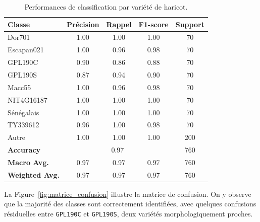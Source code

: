\begin{table}[H]
	\centering
	\caption{Performances de classification par variété de haricot.}
	\label{tab:classification_metrics}
	\begin{tabular}{|l|c|c|c|c|}
		\hline
		\textbf{Classe}        & \textbf{Précision}        & \textbf{Rappel} & \textbf{F1-score} & \textbf{Support} \\
		\hline
		Dor701                 & 1.00                      & 1.00            & 1.00              & 70               \\
		Escapan021             & 1.00                      & 0.96            & 0.98              & 70               \\
		GPL190C                & 0.90                      & 0.86            & 0.88              & 70               \\
		GPL190S                & 0.87                      & 0.94            & 0.90              & 70               \\
		Macc55                 & 1.00                      & 0.96            & 0.98              & 70               \\
		NIT4G16187             & 1.00                      & 1.00            & 1.00              & 70               \\
		Sénégalais             & 1.00                      & 1.00            & 1.00              & 70               \\
		TY339612               & 0.96                      & 1.00            & 0.98              & 70               \\
		Autre                  & 1.00                      & 1.00            & 1.00              & 200              \\
		\hline
		\textbf{Accuracy}      & \multicolumn{3}{c|}{0.97} & 760                                                    \\
		\textbf{Macro Avg.}    & 0.97                      & 0.97            & 0.97              & 760              \\
		\textbf{Weighted Avg.} & 0.97                      & 0.97            & 0.97              & 760              \\
		\hline
	\end{tabular}
\end{table}

La Figure~\ref{fig:matrice_confusion} illustre la matrice de confusion.
On y observe que la majorité des classes sont correctement identifiées, avec quelques confusions résiduelles entre \texttt{GPL190C} et \texttt{GPL190S}, deux variétés morphologiquement proches.


